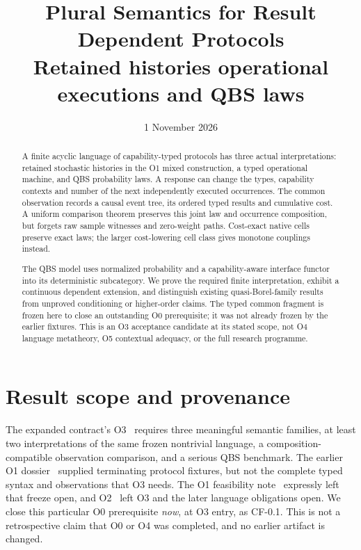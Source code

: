 \documentclass[11pt,a4paper]{article}
\title{Plural Semantics for Result Dependent Protocols\\[5pt]
\large Retained histories operational executions and QBS laws}
\author{}
\date{1 November 2026}
\theoremstyle{definition}
\begin{document}
\maketitle

\begin{abstract}
A finite acyclic language of capability-typed protocols has three actual
interpretations: retained stochastic histories in the O1 mixed construction,
a typed operational machine, and QBS probability laws. A response can change
the types, capability contexts and number of the next independently executed
occurrences. The common observation records a causal event tree, its ordered
typed results and cumulative cost. A uniform comparison theorem preserves
this joint law and occurrence composition, but forgets raw sample witnesses
and zero-weight paths. Cost-exact native cells preserve exact laws; the
larger cost-lowering cell class gives monotone couplings instead.

The QBS model uses normalized probability and a capability-aware interface
functor into its deterministic subcategory. We prove the required finite
interpretation, exhibit a continuous dependent extension, and distinguish
existing quasi-Borel-family results from unproved conditioning or
higher-order claims. The typed common fragment is frozen here to close an
outstanding O0 prerequisite; it was not already frozen by the earlier
fixtures. This is an O3 acceptance candidate at its stated scope, not O4
language metatheory, O5 contextual adequacy, or the full research programme.
\end{abstract}

\tableofcontents

\section{Result scope and provenance}\label{sec:scope}
The expanded contract's O3~\cite{Contract} requires three meaningful semantic
families, at least two interpretations of the same frozen nontrivial language,
a composition-compatible observation comparison, and a serious QBS benchmark.
The earlier O1 dossier~\cite{O1} supplied terminating protocol fixtures, but
not the complete typed syntax and observations that O3 needs. The O1
feasibility note~\cite{Feasibility} expressly left that freeze open, and O2~\cite{O2} left O3
and the later language obligations open. We close this particular O0
prerequisite \emph{now}, at O3 entry, as CF-0.1. This is not a retrospective
claim that O0 or O4 was completed, and no earlier artifact is changed.
\end{document}
